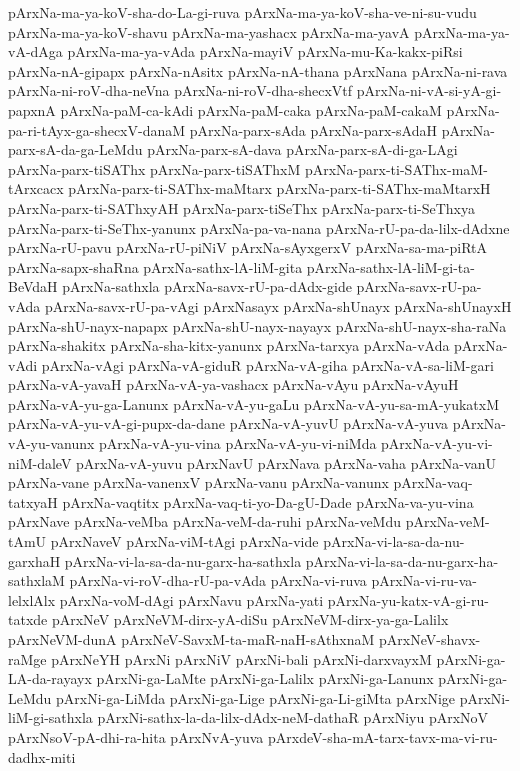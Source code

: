 {pArxNa-ma-ya-koV-sha-do-La-gi-ruva
pArxNa-ma-ya-koV-sha-ve-ni-su-vudu
pArxNa-ma-ya-koV-shavu
pArxNa-ma-yashacx
pArxNa-ma-yavA
pArxNa-ma-ya-vA-dAga
pArxNa-ma-ya-vAda
pArxNa-mayiV
pArxNa-mu-Ka-kakx-piRsi
pArxNa-nA-gipapx
pArxNa-nAsitx
pArxNa-nA-thana
pArxNana
pArxNa-ni-rava
pArxNa-ni-roV-dha-neVna
pArxNa-ni-roV-dha-shecxVtf
pArxNa-ni-vA-si-yA-gi-papxnA
pArxNa-paM-ca-kAdi
pArxNa-paM-caka
pArxNa-paM-cakaM
pArxNa-pa-ri-tAyx-ga-shecxV-danaM
pArxNa-parx-sAda
pArxNa-parx-sAdaH
pArxNa-parx-sA-da-ga-LeMdu
pArxNa-parx-sA-dava
pArxNa-parx-sA-di-ga-LAgi
pArxNa-parx-tiSAThx
pArxNa-parx-tiSAThxM
pArxNa-parx-ti-SAThx-maM-tArxcacx
pArxNa-parx-ti-SAThx-maMtarx
pArxNa-parx-ti-SAThx-maMtarxH
pArxNa-parx-ti-SAThxyAH
pArxNa-parx-tiSeThx
pArxNa-parx-ti-SeThxya
pArxNa-parx-ti-SeThx-yanunx
pArxNa-pa-va-nana
pArxNa-rU-pa-da-lilx-dAdxne
pArxNa-rU-pavu
pArxNa-rU-piNiV
pArxNa-sAyxgerxV
pArxNa-sa-ma-piRtA
pArxNa-sapx-shaRna
pArxNa-sathx-lA-liM-gita
pArxNa-sathx-lA-liM-gi-ta-BeVdaH
pArxNa-sathxla
pArxNa-savx-rU-pa-dAdx-gide
pArxNa-savx-rU-pa-vAda
pArxNa-savx-rU-pa-vAgi
pArxNasayx
pArxNa-shUnayx
pArxNa-shUnayxH
pArxNa-shU-nayx-napapx
pArxNa-shU-nayx-nayayx
pArxNa-shU-nayx-sha-raNa
pArxNa-shakitx
pArxNa-sha-kitx-yanunx
pArxNa-tarxya
pArxNa-vAda
pArxNa-vAdi
pArxNa-vAgi
pArxNa-vA-giduR
pArxNa-vA-giha
pArxNa-vA-sa-liM-gari
pArxNa-vA-yavaH
pArxNa-vA-ya-vashacx
pArxNa-vAyu
pArxNa-vAyuH
pArxNa-vA-yu-ga-Lanunx
pArxNa-vA-yu-gaLu
pArxNa-vA-yu-sa-mA-yukatxM
pArxNa-vA-yu-vA-gi-pupx-da-dane
pArxNa-vA-yuvU
pArxNa-vA-yuva
pArxNa-vA-yu-vanunx
pArxNa-vA-yu-vina
pArxNa-vA-yu-vi-niMda
pArxNa-vA-yu-vi-niM-daleV
pArxNa-vA-yuvu
pArxNavU
pArxNava
pArxNa-vaha
pArxNa-vanU
pArxNa-vane
pArxNa-vanenxV
pArxNa-vanu
pArxNa-vanunx
pArxNa-vaq-tatxyaH
pArxNa-vaqtitx
pArxNa-vaq-ti-yo-Da-gU-Dade
pArxNa-va-yu-vina
pArxNave
pArxNa-veMba
pArxNa-veM-da-ruhi
pArxNa-veMdu
pArxNa-veM-tAmU
pArxNaveV
pArxNa-viM-tAgi
pArxNa-vide
pArxNa-vi-la-sa-da-nu-garxhaH
pArxNa-vi-la-sa-da-nu-garx-ha-sathxla
pArxNa-vi-la-sa-da-nu-garx-ha-sathxlaM
pArxNa-vi-roV-dha-rU-pa-vAda
pArxNa-vi-ruva
pArxNa-vi-ru-va-lelxlAlx
pArxNa-voM-dAgi
pArxNavu
pArxNa-yati
pArxNa-yu-katx-vA-gi-ru-tatxde
pArxNeV
pArxNeVM-dirx-yA-diSu
pArxNeVM-dirx-ya-ga-Lalilx
pArxNeVM-dunA
pArxNeV-SavxM-ta-maR-naH-sAthxnaM
pArxNeV-shavx-raMge
pArxNeYH
pArxNi
pArxNiV
pArxNi-bali
pArxNi-darxvayxM
pArxNi-ga-LA-da-rayayx
pArxNi-ga-LaMte
pArxNi-ga-Lalilx
pArxNi-ga-Lanunx
pArxNi-ga-LeMdu
pArxNi-ga-LiMda
pArxNi-ga-Lige
pArxNi-ga-Li-giMta
pArxNige
pArxNi-liM-gi-sathxla
pArxNi-sathx-la-da-lilx-dAdx-neM-dathaR
pArxNiyu
pArxNoV
pArxNsoV-pA-dhi-ra-hita
pArxNvA-yuva
pArxdeV-sha-mA-tarx-tavx-ma-vi-ru-dadhx-miti
}
